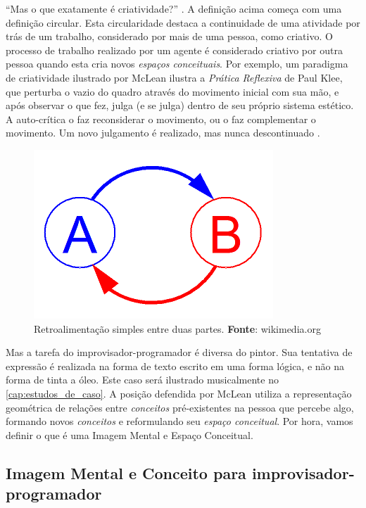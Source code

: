 ``Mas o que exatamente é criatividade?'' \cite[p.~117--127]{McLean2011}. A definição acima começa com uma definição circular. Esta circularidade destaca a continuidade de uma atividade por trás de um trabalho, considerado por mais de uma pessoa, como criativo.  O processo de trabalho realizado por um agente é considerado criativo por outra pessoa quando esta cria novos \emph{espaços conceituais}. Por exemplo, um paradigma de criatividade ilustrado por McLean ilustra a \emph{Prática Reflexiva} de Paul Klee, que perturba o vazio do quadro através do movimento inicial com sua mão, e após observar o que fez, julga (e se julga) dentro de seu próprio sistema estético. A auto-crítica o faz reconsiderar o movimento, ou o faz complementar o movimento. Um novo julgamento é realizado, mas nunca descontinuado .

  \begin{figure}[!h]
    \centering
    \includegraphics[scale=0.5]{imagens/Simple_Feedback_02.png}
    \caption{Retroalimentação simples entre duas partes. \textbf{Fonte}: wikimedia.org}
    \label{fig:feedback}
  \end{figure}

Mas a tarefa do improvisador-programador é diversa do pintor. Sua tentativa de expressão é realizada na forma de texto escrito em uma forma lógica, e não na forma de tinta a óleo. Este caso será ilustrado musicalmente no \autoref{cap:estudos_de_caso}. A posição defendida por McLean utiliza a representação geométrica de relações entre \emph{conceitos} pré-existentes na pessoa que percebe algo, formando novos \emph{conceitos} e reformulando seu \emph{espaço conceitual}. Por hora, vamos definir o que é uma Imagem Mental e Espaço Conceitual.

\subsection{Imagem Mental e Conceito para improvisador-programador}\label{sec:imagem_mental}

